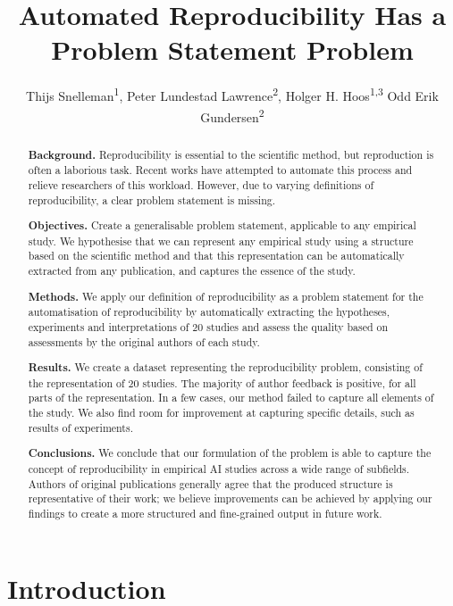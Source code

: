 \documentclass[letterpaper]{article} %
\title{Automated Reproducibility Has a Problem Statement Problem}
\author {
    Thijs Snelleman\textsuperscript{\rm 1},
    Peter Lundestad Lawrence\textsuperscript{\rm 2},
    Holger H. Hoos\textsuperscript{\rm 1,3} 
    Odd Erik Gundersen\textsuperscript{\rm 2}
}
\begin{document}
\maketitle

\begin{abstract}

\textbf{Background.} Reproducibility is essential to the scientific method, but reproduction is often a laborious task. Recent works have attempted to automate this process and relieve researchers of this workload. However, due to varying definitions of reproducibility, a clear problem statement is missing.

\textbf{Objectives.}
Create a generalisable problem statement, applicable to any empirical study. We hypothesise that we can represent any empirical study using a structure based on the scientific method and that this representation can be automatically extracted from any publication, and captures the essence of the study.

\textbf{Methods.}
We apply our definition of reproducibility as a problem statement for the automatisation of reproducibility by automatically extracting the hypotheses, experiments and interpretations of $20$ studies and assess the quality based on assessments by the original authors of each study.

\textbf{Results.}
We create a dataset representing the reproducibility problem, consisting of the representation of $20$ studies. The majority of author feedback is positive, for all parts of the representation. In a few cases, our method failed to capture all elements of the study. We also find room for improvement at capturing specific details, such as results of experiments.

\textbf{Conclusions.}
We conclude that our formulation of the problem is able to capture the concept of reproducibility in empirical AI studies across a wide range of subfields. Authors of original publications generally agree that the produced structure is representative of their work; we believe improvements can be achieved by applying our findings to create a more structured and fine-grained output in future work.

\end{abstract}

\section{Introduction}
\end{document}
